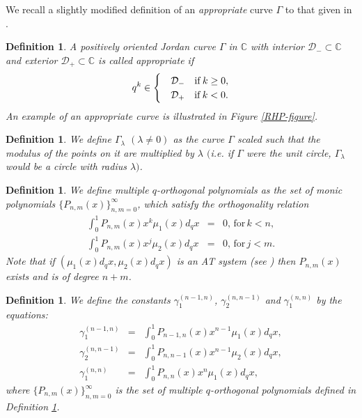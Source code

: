 \documentclass[a4paper,reqno]{amsart}
\numberwithin{equation}{section}
\newtheorem{definition}[theorem]{Definition}
\numberwithin{figure}{section}
\begin{document}
We recall a slightly modified definition of an \textit{appropriate} curve $\Gamma$ to that given in \cite[Defintion 1.2]{qRHP}. 

\begin{definition}\label{admissable}
A positively oriented Jordan curve $\Gamma$ in $\mathbb C$ with interior $\mathcal D_-\subset\mathbb C$ and exterior $\mathcal D_+\subset\mathbb C$ is called {\em appropriate} if 
\[
q^k\in \begin{cases}
&\mathcal D_- \quad {\rm if}\, k\ge 0,\\
&\mathcal D_+ \quad {\rm if}\, k< 0.
\end{cases}
\]
An example of an {\em appropriate} curve is illustrated in Figure \ref{RHP-figure}.
\end{definition}

\begin{definition}\label{scaled curve}
 We define $\Gamma_\lambda$ $(\lambda \neq 0)$ as the curve $\Gamma$ scaled such that the modulus of the points on it are multiplied by $
\lambda$ $($i.e. if $\Gamma$ were the unit circle, $\Gamma_{\lambda}$ would be a circle with radius $\lambda$$)$.   
\end{definition}

\begin{definition}\label{multiple ortho def}
    We define multiple $q$-orthogonal polynomials as the set of monic polynomials $\{ P_{n,m}(x)\}_{n,m=0}^\infty$, 
which satisfy the orthogonality relation
\begin{subequations}\label{multiple q ortho def}
\begin{eqnarray}
\int_{0}^1 P_{n,m}(x)x^k\mu_1(x) d_qx &=& 0,\,\mathrm{for}\,k<n ,\\
\int_{0}^1 P_{n,m}(x)x^j\mu_2(x) d_qx &=& 0,\,\mathrm{for}\,j<m .
\end{eqnarray}
\end{subequations}
Note that if $(\mu_1(x)d_qx,\mu_2(x)d_qx)$ is an AT system (see \cite[Chapter 23]{ismail2005classical}) then $P_{n,m}(x)$ exists and is of degree $n+m$.
\end{definition}


\begin{definition}\label{L2 def}
We define the constants $\gamma_1^{(n-1,n)}$, $\gamma_2^{(n,n-1)}$ and $\gamma_1^{(n,n)}$ by the equations:
\begin{subequations}\label{gamma def}
    \begin{eqnarray}
        \gamma_1^{(n-1,n)} &=& \int_{0}^1 P_{n-1,n}(x)x^{n-1} \mu_{1}(x) d_qx,\\
        \gamma_2^{(n,n-1)} &=& \int_{0}^1 P_{n,n-1}(x)x^{n-1} \mu_{2}(x) d_qx,\\
        \gamma_1^{(n,n)} &=& \int_{0}^1 P_{n,n}(x)x^n \mu_{1}(x) d_qx,
    \end{eqnarray}
\end{subequations}
where $\{P_{n,m}(x)\}_{n,m=0}^\infty$ is the set of multiple $q$-orthogonal polynomials defined in Definition \ref{multiple ortho def}.
\end{definition}
\end{document}
